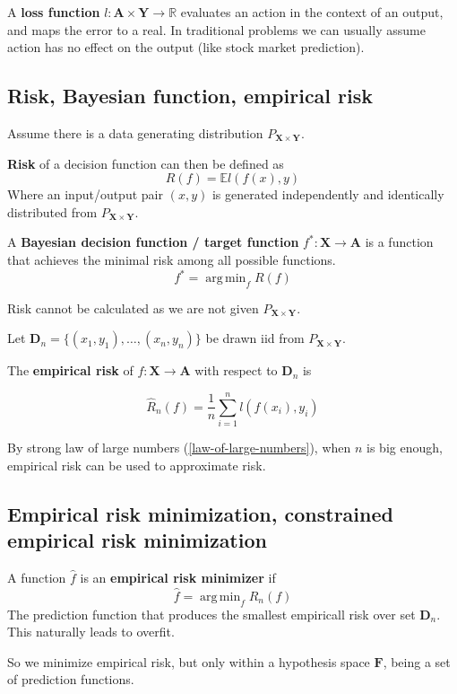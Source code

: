 \documentclass{article}
\DeclareMathOperator*{\argmin}{arg\,min}
\begin{document}
A \textbf{loss function} $\mathit{l}: \mathbf{A} \times \mathbf{Y} \to \mathbb{R}$ evaluates an action in the context of an output, and maps the error to a real.
In traditional problems we can usually assume action has no effect on the output (like stock market prediction).

\subsection{Risk, Bayesian function, empirical risk}

Assume there is a data generating distribution $P_{\mathbf{X} \times \mathbf{Y}}$.

\textbf{Risk} of a decision function can then be defined as
$$
R(f) = \mathbb{E}\mathit{l}(f(x), y)
$$
Where an input/output pair $(x, y)$ is generated independently and identically distributed from $P_{\mathbf{X} \times \mathbf{Y}}$.

A \textbf{Bayesian decision function / target function} $f^* : \mathbf{X} \to \mathbf{A}$ is a function that achieves the minimal risk among all possible functions.
$$
f^* = \argmin_{f}{R(f)}
$$

Risk cannot be calculated as we are not given $P_{\mathbf{X} \times \mathbf{Y}}$.

Let $\mathbf{D}_n = \{(x_1, y_1), \dots, (x_n, y_n)\}$ be drawn iid from $P_{\mathbf{X} \times \mathbf{Y}}$.

The \textbf{empirical risk} of $f : \mathbf{X} \to \mathbf{A}$ with respect to $\mathbf{D}_n$ is

$$
\hat{R}_n(f) = \frac{1}{n} \sum_{i = 1}^{n}{\mathit{l}(f(x_i), y_i)}
$$

By strong law of large numbers (\ref{law-of-large-numbers}), when $n$ is big enough, empirical risk can be used to approximate risk.

\subsection{Empirical risk minimization, constrained empirical risk minimization}

A function $\hat{f}$ is an \textbf{empirical risk minimizer} if
$$
\hat{f} = \argmin_{f}{\hat{R}_n(f)}
$$
The prediction function that produces the smallest empiricall risk over set $\mathbf{D}_n$.
This naturally leads to overfit.

So we minimize empirical risk, but only within a hypothesis space $\mathbf{F}$, being a set of prediction functions.
\end{document}
